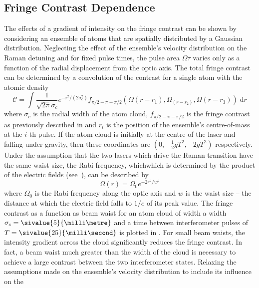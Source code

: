 \subsection{Fringe Contrast Dependence}\label{subsec:fringe_contrast}
The effects of a gradient of intensity on the fringe contrast can be shown by
considering an ensemble of atoms that are spatially distributed by a Gaussian
distribution. Neglecting the effect of the ensemble's velocity distribution on
the Raman detuning and for fixed pulse times, the pulse area \(\Omega \tau\)
varies only as a function of the radial displacement from the optic axis. The
total fringe contrast can be determined by a convolution of the contrast for a
single atom with the atomic density
\begin{equation}
	\mathcal{C} = \int \frac{1}{\sqrt{2\pi}\sigma_c}e^{-r^2/(2\sigma_c^2)} f_{\pi/2-\pi-\pi/2}\left(\Omega(r-r_1),\Omega_(r-r_2),\Omega(r-r_3)\right) \;\mathrm{d}r
	\label{eq:cloud_contrast}
\end{equation}
where \(\sigma_c\) is the radial width of the atom cloud,
\(f_{\pi/2-\pi-\pi/2}\) is the fringe contrast as previously described in
 and \(r_i\) is the position of the ensemble's
centre-of-mass at the \(i\)-th pulse. If the atom cloud is initially at the
centre of the laser and falling under gravity, then these coordinates are
\(\left(0, -\frac{1}{2}g T^2, -2 g T^2\right)\) respectively. Under the
assumption that the two lasers which drive the Raman transition have the same
waist size, the Rabi frequency, whichwhich is determined by the product of the
electric fields (see~), can be described by
\begin{equation}
	\Omega(r) = \Omega_0 e^{-2 r^2/w^2}
\end{equation}
where \(\Omega_0\) is the Rabi frequency along the optic axis and \(w\) is the
waist size -- the distance at which the electric field falls to \(1/e\) of its
peak value. The fringe contrast as a function as beam waist for an atom cloud of
width a width \(\sigma_c = \sivalue{5}{\milli\metre}\) and a time between
interferometer pulses of \(T = \sivalue{25}{\milli\second}\) is plotted in
. For small beam waists, the intensity
gradient across the cloud significantly reduces the fringe contrast. In fact, a
beam waist much greater than the width of the cloud is necessary to achieve a
large contrast between the two interferometer states. Relaxing the assumptions
made on the ensemble's velocity distribution to include its influence on the

